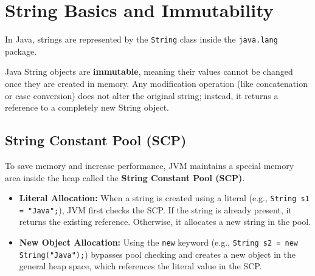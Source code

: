 \documentclass[12pt,a4paper]{article}
\begin{document}
\section{String Basics and Immutability}

In Java, strings are represented by the \texttt{String} class inside the \texttt{java.lang} package. 

\begin{tcolorbox}[defbox, title={\textbf{String Immutability Concept}}]
Java String objects are \textbf{immutable}, meaning their values cannot be changed once they are created in memory. Any modification operation (like concatenation or case conversion) does not alter the original string; instead, it returns a reference to a completely new String object.
\end{tcolorbox}

\subsection{String Constant Pool (SCP)}
To save memory and increase performance, JVM maintains a special memory area inside the heap called the \textbf{String Constant Pool (SCP)}.
\begin{itemize}[leftmargin=*, itemsep=3.5pt]
  \item \textbf{Literal Allocation:} When a string is created using a literal (e.g., \texttt{String s1 = "Java";}), JVM first checks the SCP. If the string is already present, it returns the existing reference. Otherwise, it allocates a new string in the pool.
  \item \textbf{New Object Allocation:} Using the \texttt{new} keyword (e.g., \texttt{String s2 = new String("Java");}) bypasses pool checking and creates a new object in the general heap space, which references the literal value in the SCP.
\end{itemize}
\end{document}
